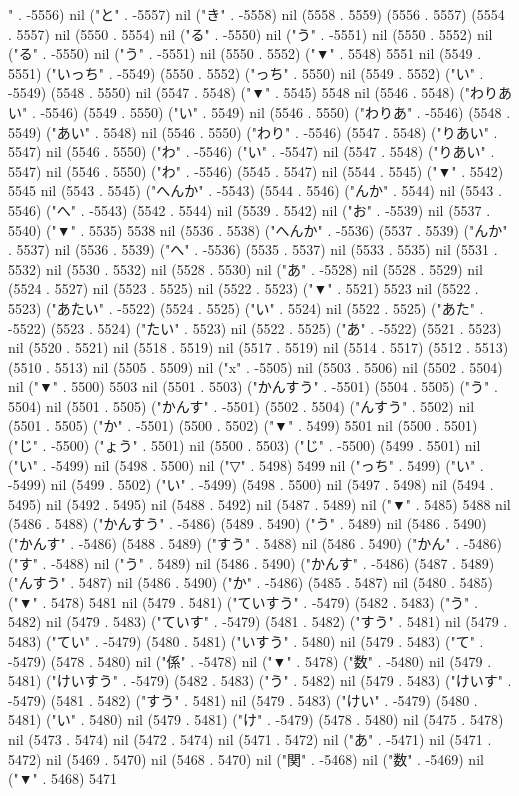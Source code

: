 " . -5556) nil ("と" . -5557) nil ("き" . -5558) nil (5558 . 5559) (5556 . 5557) (5554 . 5557) nil (5550 . 5554) nil ("る" . -5550) nil ("う" . -5551) nil (5550 . 5552) nil ("る" . -5550) nil ("う" . -5551) nil (5550 . 5552) ("▼" . 5548) 5551 nil (5549 . 5551) ("いっち" . -5549) (5550 . 5552) ("っち" . 5550) nil (5549 . 5552) ("い" . -5549) (5548 . 5550) nil (5547 . 5548) ("▼" . 5545) 5548 nil (5546 . 5548) ("わりあい" . -5546) (5549 . 5550) ("い" . 5549) nil (5546 . 5550) ("わりあ" . -5546) (5548 . 5549) ("あい" . 5548) nil (5546 . 5550) ("わり" . -5546) (5547 . 5548) ("りあい" . 5547) nil (5546 . 5550) ("わ" . -5546) ("い" . -5547) nil (5547 . 5548) ("りあい" . 5547) nil (5546 . 5550) ("わ" . -5546) (5545 . 5547) nil (5544 . 5545) ("▼" . 5542) 5545 nil (5543 . 5545) ("へんか" . -5543) (5544 . 5546) ("んか" . 5544) nil (5543 . 5546) ("へ" . -5543) (5542 . 5544) nil (5539 . 5542) nil ("お" . -5539) nil (5537 . 5540) ("▼" . 5535) 5538 nil (5536 . 5538) ("へんか" . -5536) (5537 . 5539) ("んか" . 5537) nil (5536 . 5539) ("へ" . -5536) (5535 . 5537) nil (5533 . 5535) nil (5531 . 5532) nil (5530 . 5532) nil (5528 . 5530) nil ("あ" . -5528) nil (5528 . 5529) nil (5524 . 5527) nil (5523 . 5525) nil (5522 . 5523) ("▼" . 5521) 5523 nil (5522 . 5523) ("あたい" . -5522) (5524 . 5525) ("い" . 5524) nil (5522 . 5525) ("あた" . -5522) (5523 . 5524) ("たい" . 5523) nil (5522 . 5525) ("あ" . -5522) (5521 . 5523) nil (5520 . 5521) nil (5518 . 5519) nil (5517 . 5519) nil (5514 . 5517) (5512 . 5513) (5510 . 5513) nil (5505 . 5509) nil ("x" . -5505) nil (5503 . 5506) nil (5502 . 5504) nil ("▼" . 5500) 5503 nil (5501 . 5503) ("かんすう" . -5501) (5504 . 5505) ("う" . 5504) nil (5501 . 5505) ("かんす" . -5501) (5502 . 5504) ("んすう" . 5502) nil (5501 . 5505) ("か" . -5501) (5500 . 5502) ("▼" . 5499) 5501 nil (5500 . 5501) ("じ" . -5500) ("ょう" . 5501) nil (5500 . 5503) ("じ" . -5500) (5499 . 5501) nil ("い" . -5499) nil (5498 . 5500) nil ("▽" . 5498) 5499 nil ("っち" . 5499) ("い" . -5499) nil (5499 . 5502) ("い" . -5499) (5498 . 5500) nil (5497 . 5498) nil (5494 . 5495) nil (5492 . 5495) nil (5488 . 5492) nil (5487 . 5489) nil ("▼" . 5485) 5488 nil (5486 . 5488) ("かんすう" . -5486) (5489 . 5490) ("う" . 5489) nil (5486 . 5490) ("かんす" . -5486) (5488 . 5489) ("すう" . 5488) nil (5486 . 5490) ("かん" . -5486) ("す" . -5488) nil ("う" . 5489) nil (5486 . 5490) ("かんす" . -5486) (5487 . 5489) ("んすう" . 5487) nil (5486 . 5490) ("か" . -5486) (5485 . 5487) nil (5480 . 5485) ("▼" . 5478) 5481 nil (5479 . 5481) ("ていすう" . -5479) (5482 . 5483) ("う" . 5482) nil (5479 . 5483) ("ていす" . -5479) (5481 . 5482) ("すう" . 5481) nil (5479 . 5483) ("てい" . -5479) (5480 . 5481) ("いすう" . 5480) nil (5479 . 5483) ("て" . -5479) (5478 . 5480) nil ("係" . -5478) nil ("▼" . 5478) ("数" . -5480) nil (5479 . 5481) ("けいすう" . -5479) (5482 . 5483) ("う" . 5482) nil (5479 . 5483) ("けいす" . -5479) (5481 . 5482) ("すう" . 5481) nil (5479 . 5483) ("けい" . -5479) (5480 . 5481) ("い" . 5480) nil (5479 . 5481) ("け" . -5479) (5478 . 5480) nil (5475 . 5478) nil (5473 . 5474) nil (5472 . 5474) nil (5471 . 5472) nil ("あ" . -5471) nil (5471 . 5472) nil (5469 . 5470) nil (5468 . 5470) nil ("関" . -5468) nil ("数" . -5469) nil ("▼" . 5468) 5471 